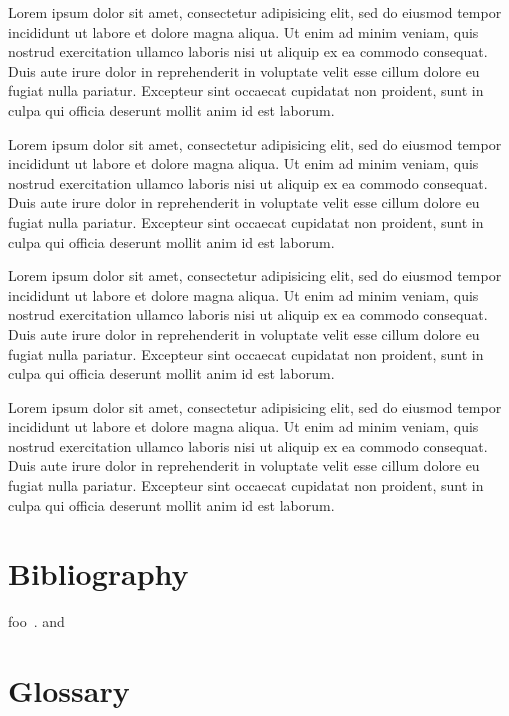 \documentclass[10pt,a4paper,extrafontsizes,oldfontcommands,oneside]{memoir}
\begin{document}
Lorem ipsum dolor sit amet, consectetur adipisicing elit, sed do eiusmod tempor incididunt ut labore et dolore magna aliqua. Ut enim ad minim veniam, quis nostrud exercitation ullamco laboris nisi ut aliquip ex ea commodo consequat. Duis aute irure dolor in reprehenderit in voluptate velit esse cillum dolore eu fugiat nulla pariatur. Excepteur sint occaecat cupidatat non proident, sunt in culpa qui officia deserunt mollit anim id est laborum.

Lorem ipsum dolor sit amet, consectetur adipisicing elit, sed do eiusmod tempor incididunt ut labore et dolore magna aliqua. Ut enim ad minim veniam, quis nostrud exercitation ullamco laboris nisi ut aliquip ex ea commodo consequat. Duis aute irure dolor in reprehenderit in voluptate velit esse cillum dolore eu fugiat nulla pariatur. Excepteur sint occaecat cupidatat non proident, sunt in culpa qui officia deserunt mollit anim id est laborum.

Lorem ipsum dolor sit amet, consectetur adipisicing elit, sed do eiusmod tempor incididunt ut labore et dolore magna aliqua. Ut enim ad minim veniam, quis nostrud exercitation ullamco laboris nisi ut aliquip ex ea commodo consequat. Duis aute irure dolor in reprehenderit in voluptate velit esse cillum dolore eu fugiat nulla pariatur. Excepteur sint occaecat cupidatat non proident, sunt in culpa qui officia deserunt mollit anim id est laborum.

Lorem ipsum dolor sit amet, consectetur adipisicing elit, sed do eiusmod tempor incididunt ut labore et dolore magna aliqua. Ut enim ad minim veniam, quis nostrud exercitation ullamco laboris nisi ut aliquip ex ea commodo consequat. Duis aute irure dolor in reprehenderit in voluptate velit esse cillum dolore eu fugiat nulla pariatur. Excepteur sint occaecat cupidatat non proident, sunt in culpa qui officia deserunt mollit anim id est laborum.


\section{Bibliography} %
\label{sec:bibliography}

foo~\citeauthor{companion}. and \cite{companion}


\section{Glossary} %
\label{sec:glossary}
\end{document}
